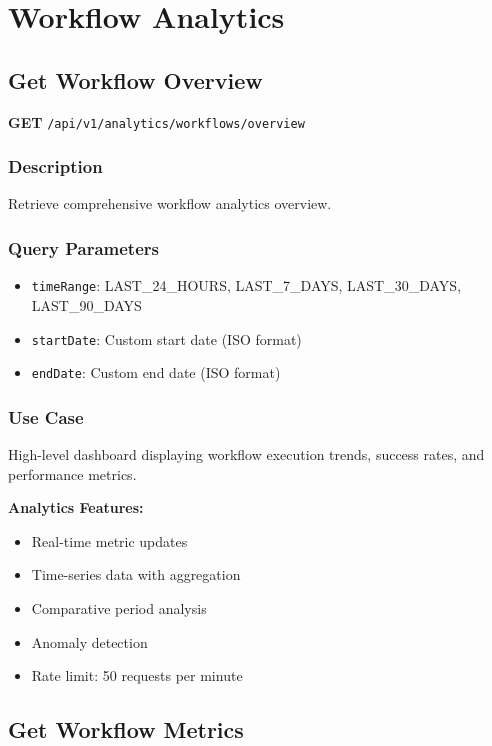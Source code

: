 \documentclass[11pt,a4paper]{report}
\begin{document}
\section{Workflow Analytics}

\subsection{Get Workflow Overview}

\textbf{GET} \texttt{/api/v1/analytics/workflows/overview}

\subsubsection{Description}
Retrieve comprehensive workflow analytics overview.

\subsubsection{Query Parameters}
\begin{itemize}[leftmargin=*]
    \item \texttt{timeRange}: LAST\_24\_HOURS, LAST\_7\_DAYS, LAST\_30\_DAYS, LAST\_90\_DAYS
    \item \texttt{startDate}: Custom start date (ISO format)
    \item \texttt{endDate}: Custom end date (ISO format)
\end{itemize}

\subsubsection{Use Case}
High-level dashboard displaying workflow execution trends, success rates, and performance metrics.

\begin{infobox}
\textbf{Analytics Features:}
\begin{itemize}[leftmargin=*]
    \item Real-time metric updates
    \item Time-series data with aggregation
    \item Comparative period analysis
    \item Anomaly detection
    \item Rate limit: 50 requests per minute
\end{itemize}
\end{infobox}

\subsection{Get Workflow Metrics}
\end{document}

